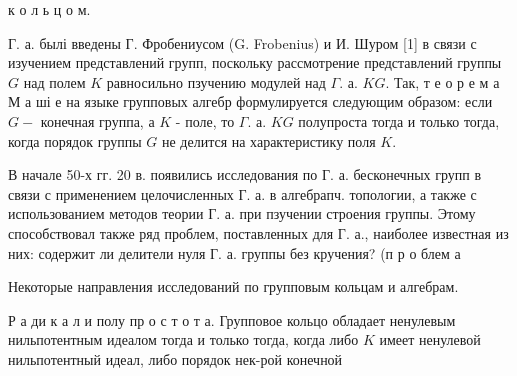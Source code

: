 \documentclass[10pt]{article}
\begin{document}
к о л ь ц о м.



Г. а. былі введены Г. Фробениусом (G. Frobenius) и И. Шуром [1] в связи с изучением представлений групп, поскольку рассмотрение представлений группы $G$ над полем $K$ равносильно пзучению модулей над $\Gamma$. а. $K G$. Так, т е о р е м а М а ші е на языке групповых алгебр формулируется следующим образом: если $G-$ конечная группа, а $K$ - поле, то $\Gamma$. а. $K G$ полупроста тогда и только тогда, когда порядок группы $G$ не делится на характеристику поля $K$.



В начале 50-х гг. 20 в. появились исследования по Г. а. бесконечных групп в связи с применением целочисленных $Г$. а. в алгебрапч. топологии, а также с использованием методов теории Г. а. при пзучении строения группы. Этому способствовал также ряд проблем, поставленных для Г. а., наиболее известная из них: содержит ли делители нуля Г. а. группы без кручения? (п р о блем а



Некоторые направления исследований по групповым кольцам и алгебрам.



Р а ди к а л и полу пр о с т о т а. Групповое кольцо обладает ненулевым нильпотентным идеалом тогда и только тогда, когда либо $K$ имеет ненулевой нильпотентный идеал, либо порядок нек-рой конечной
\end{document}
